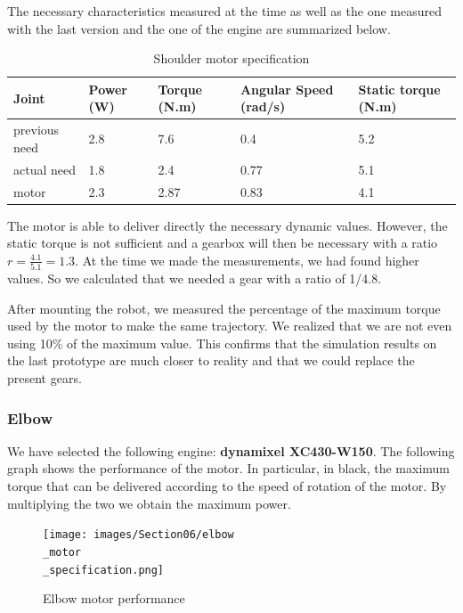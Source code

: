 \bigbreak
The necessary characteristics measured at the time as well as the one measured with the last version and the one of the engine are summarized below.
\begin{table}[ht]
    \centering
    \begin{tabular}{|p{1.5cm} | p{2cm} | p{2.5cm}| p{2.7cm} | p{2.7cm} |} 
        \hline
        \textbf{Joint}& \textbf{Power (W)} & \textbf{Torque (N.m)} & \textbf{Angular Speed (rad/s)} & \textbf{Static torque (N.m)}\\ [0.3ex]
        \hline
        previous need & 2.8 & 7.6 & 0.4 & 5.2 \\ 
        \hline
        actual need & 1.8 & 2.4 & 0.77 & 5.1 \\ 
        \hline
        motor & 2.3 & 2.87 & 0.83 & 4.1\\ 
        \hline
    \end{tabular}
    \caption{Shoulder motor specification}
\end{table}
\FloatBarrier
The motor is able to deliver directly the necessary dynamic values. However, the static torque is not sufficient and a gearbox will then be necessary with a ratio $r=\frac{4.1}{5.1}=1.3$. At the time we made the measurements, we had found higher values. So we calculated that we needed a gear with a ratio of 1/4.8.

\bigbreak
After mounting the robot, we measured the percentage of the maximum torque used by the motor to make the same trajectory. We realized that we are not even using 10\% of the maximum value. This confirms that the simulation results on the last prototype are much closer to reality and that we could replace the present gears.

\subsubsection{Elbow}


 We have selected the following engine: \textbf{dynamixel XC430-W150}. The following graph shows the performance of the motor. In particular, in black, the maximum torque that can be delivered according to the speed of rotation of the motor. By multiplying the two we obtain the maximum power.
\begin{figure}[ht]
    \centering
    \texttt{[image: images/Section06/elbow\\\_motor\\\_specification.png]}
    \caption{Elbow motor performance}
    \label{fig:mesh15}
\end{figure}
\FloatBarrier

